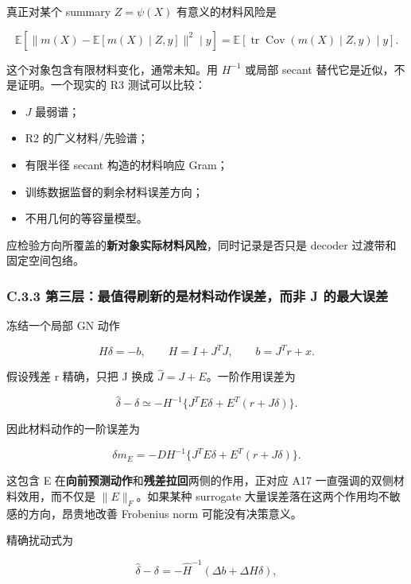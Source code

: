 \documentclass[
  11pt,
  a4paper,
]{article}
\providecommand{\tightlist}{%
  \setlength{\itemsep}{0pt}\setlength{\parskip}{0pt}}
\begin{document}
真正对某个 summary \(Z=\psi(X)\) 有意义的材料风险是

\[
\mathbb{E}[\|m(X)-\mathbb{E}[m(X)\mid Z,y]\|^2\mid y]
=\mathbb{E}[\operatorname{tr}\operatorname{Cov}(m(X)\mid Z,y)\mid y].
\]

这个对象包含有限材料变化，通常未知。用 \(H^{-1}\) 或局部 secant
替代它是近似，不是证明。一个现实的 R3 测试可以比较：

\begin{itemize}
\tightlist
\item
  \(J\) 最弱谱；
\item
  R2 的广义材料/先验谱；
\item
  有限半径 secant 构造的材料响应 Gram；
\item
  训练数据监督的剩余材料误差方向；
\item
  不用几何的等容量模型。
\end{itemize}

应检验方向所覆盖的\textbf{新对象实际材料风险}，同时记录是否只是 decoder
过渡带和固定空间包络。

\hypertarget{c.3.3-ux7b2cux4e09ux5c42ux6700ux503cux5f97ux5237ux65b0ux7684ux662fux6750ux6599ux52a8ux4f5cux8befux5deeux800cux975e-j-ux7684ux6700ux5927ux8befux5dee}{%
\subsubsection{C.3.3 第三层：最值得刷新的是材料动作误差，而非 J
的最大误差}\label{c.3.3-ux7b2cux4e09ux5c42ux6700ux503cux5f97ux5237ux65b0ux7684ux662fux6750ux6599ux52a8ux4f5cux8befux5deeux800cux975e-j-ux7684ux6700ux5927ux8befux5dee}}

冻结一个局部 GN 动作

\[
H\delta=-b,\qquad H=I+J^TJ,\qquad b=J^Tr+x.
\]

假设残差 r 精确，只把 J 换成 \(\widehat J=J+E\)。一阶作用误差为

\[
\widehat\delta-\delta
\simeq-H^{-1}\{J^TE\delta+E^T(r+J\delta)\}.
\]

因此材料动作的一阶误差为

\[
\boxed{\quad\delta m_E=-DH^{-1}\{J^TE\delta+E^T(r+J\delta)\}.\quad}
\]

这包含 E 在\textbf{向前预测动作}和\textbf{残差拉回}两侧的作用，正对应
A17 一直强调的双侧材料效用，而不仅是 \(\|E\|_F\)。如果某种 surrogate
大量误差落在这两个作用均不敏感的方向，昂贵地改善 Frobenius norm
可能没有决策意义。

精确扰动式为

\[
\widehat\delta-\delta=-\widehat H^{-1}(\Delta b+\Delta H\delta),
\]
\end{document}
